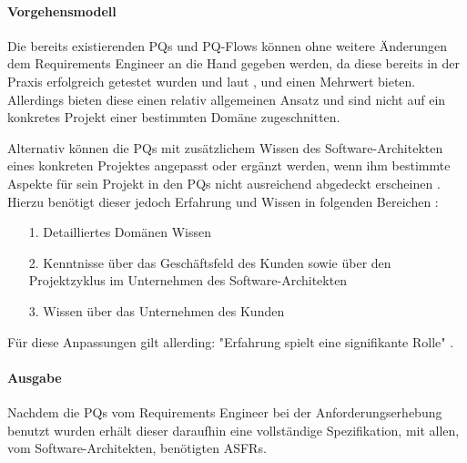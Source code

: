 \paragraph{Vorgehensmodell} \label{probing_model}

Die bereits existierenden PQs und PQ-Flows können ohne weitere Änderungen dem Requirements Engineer an die Hand gegeben werden, da diese bereits in der Praxis erfolgreich getestet wurden und laut \cite{Ros01}, \cite{Ros02} und \cite{Ros03} einen Mehrwert bieten. Allerdings bieten diese einen relativ allgemeinen Ansatz und sind nicht auf ein konkretes Projekt einer bestimmten Domäne zugeschnitten. 

Alternativ können die PQs mit zusätzlichem Wissen des Software-Architekten eines konkreten Projektes angepasst oder ergänzt werden, wenn ihm bestimmte Aspekte für sein Projekt in den PQs nicht ausreichend abgedeckt erscheinen \cite{Ros02}. Hierzu benötigt dieser jedoch Erfahrung und Wissen in folgenden Bereichen \cite{Ros02}: \\

\begin{itemize}
\item[1.] Detailliertes Domänen Wissen
\item[2.] Kenntnisse über das Geschäftsfeld des Kunden sowie über den Projektzyklus im Unternehmen des Software-Architekten
\item[3.] Wissen über das Unternehmen des Kunden
\end{itemize}

Für diese Anpassungen gilt allerding: "Erfahrung spielt eine signifikante Rolle" \cite{Ros02}. \\

\paragraph{Ausgabe}

Nachdem die PQs vom Requirements Engineer bei der Anforderungserhebung benutzt wurden erhält dieser daraufhin eine vollständige Spezifikation, mit allen, vom Software-Architekten, benötigten ASFRs. \\

